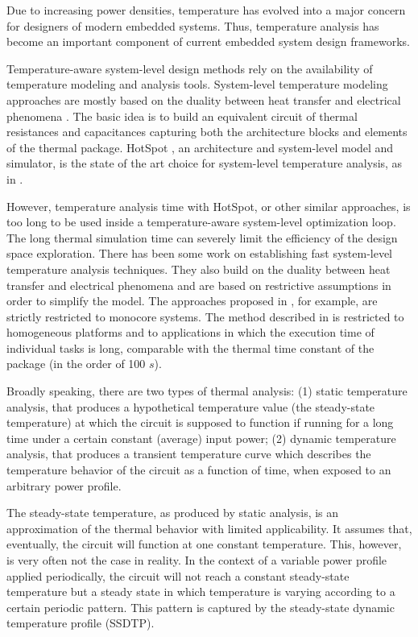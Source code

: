 Due to increasing power densities, temperature has evolved into a major concern for designers of modern embedded systems. Thus, temperature analysis has become an important component of current embedded system design frameworks.

Temperature-aware system-level design methods rely on the availability of temperature modeling and analysis tools. System-level temperature modeling approaches are mostly based on the duality between heat transfer and electrical phenomena \cite{kreith2000}. The basic idea is to build an equivalent circuit of thermal resistances and capacitances capturing both the architecture blocks and elements of the thermal package. HotSpot \cite{huang2003}, an architecture and system-level model and simulator, is the state of the art choice for system-level temperature analysis, as in \cite{srinivasan2004, liao2005, coskun2006, liu2007, huang2009, xiang2010, thiele2011}.

However, temperature analysis time with HotSpot, or other similar approaches, is too long to be used inside a tempera\-ture-aware system-level optimization loop. The long thermal simulation time can severely limit the efficiency of the design space exploration. There has been some work on establishing fast system-level temperature analysis techniques. They also build on the duality between heat transfer and electrical phenomena and are based on restrictive assumptions in order to simplify the model. The approaches proposed in \cite{rai2011, bao2010}, for example, are strictly restricted to monocore systems. The method described in \cite{rao2009} is restricted to homogeneous platforms and to applications in which the execution time of individual tasks is long, comparable with the thermal time constant of the package (in the order of 100 $s$).

Broadly speaking, there are two types of thermal analysis: (1) static temperature analysis, that produces a hypothetical temperature value (the steady-state temperature) at which the circuit is supposed to function if running for a long time under a certain constant (average) input power; (2) dynamic temperature analysis, that produces a transient temperature curve which describes the temperature behavior of the circuit as a function of time, when exposed to an arbitrary power profile.

The steady-state temperature, as produced by static analysis, is an approximation of the thermal behavior with limited applicability. It assumes that, eventually, the circuit will function at one constant temperature.  This, however, is very often not the case in reality. In the context of a variable power profile applied periodically, the circuit will not reach a constant steady-state temperature but a steady state in which temperature is varying according to a certain periodic pattern. This pattern is captured by the steady-state dynamic temperature profile (SSDTP).

